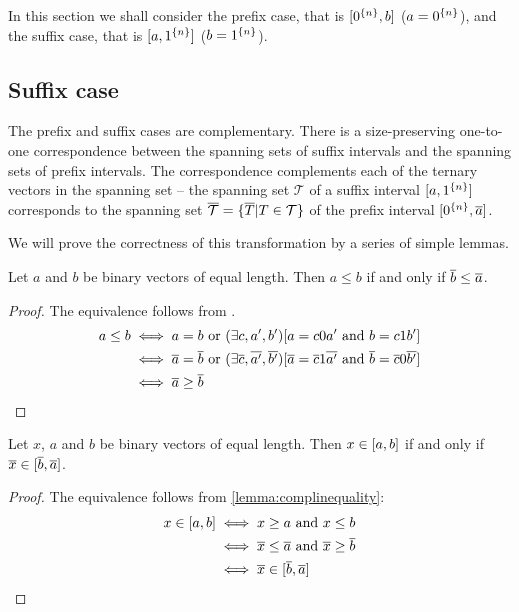 In this section we shall consider the prefix case,
that is $[0^{\{n\}}, b]$ ($a = 0^{\{n\}}$),
and the suffix case,
that is $[a, 1^{\{n\}}]$ ($b = 1^{\{n\}}$).

\subsection{Suffix case}
\label{sec:suffix}


The prefix and suffix cases are complementary.
There is a size-preserving
one-to-one
correspondence between
the spanning sets of suffix intervals
and the spanning sets
of prefix intervals.
The correspondence complements each of the ternary vectors in the spanning set
-- the spanning set $\mathcal{T}$
of a suffix interval $[a, 1^{\{n\}}]$
corresponds to the spanning set
$\overline{\mathcal{T}}
= \{\overline{T} | T \in \mathcal{T}\}$
of the prefix interval
$[0^{\{n\}}, \overline{a}]$.

We will prove the correctness of this transformation
by a series of simple lemmas.

\begin{lemma}
\label{lemma:complinequality}
Let $a$ and $b$ be binary vectors of equal length.
Then $a \leq b$ if and only if $\overline{b} \leq \overline{a}$.
\end{lemma}

\begin{proof}
The equivalence follows from .
\begin{align*}
a \leq b &\iff a=b \text{ or } (\exists c, a', b') [a=c0a' \text{ and } b=c1b'] \\
&\iff \overline{a}=\overline{b} \text{ or } (\exists \overline{c}, \overline{a'}, \overline{b'}) [\overline{a}=\overline{c}1\overline{a'} \text{ and } \overline{b}=\overline{c}0\overline{b'}] \\
&\iff \overline{a} \geq \overline{b}
\end{align*}
\end{proof}

\begin{lemma}
\label{lemma:complinterval}
Let $x$, $a$ and $b$ be binary vectors of equal length.
Then $x \in [a, b]$ if and only if $\overline{x} \in [\overline{b}, \overline{a}]$.
\end{lemma}

\begin{proof}
The equivalence follows from \cref{lemma:complinequality}:
\begin{align*}
x \in [a, b] &\iff x \geq a \text{ and } x \leq b \\
&\iff \overline{x} \leq \overline{a} \text{ and } \overline{x} \geq \overline{b} \\
&\iff \overline{x} \in [\overline{b}, \overline{a}]
\end{align*}
\end{proof}

